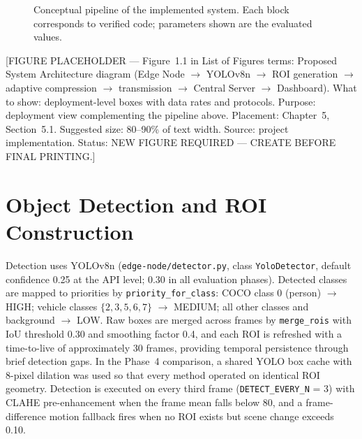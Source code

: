\begin{figure}[H]
\centering
{}
\caption{Conceptual pipeline of the implemented system. Each block corresponds to verified code; parameters shown are the evaluated values.}
\label{fig:pipeline}
\end{figure}

[FIGURE PLACEHOLDER --- Figure~1.1 in List of Figures terms: Proposed System Architecture diagram (Edge Node $\rightarrow$ YOLOv8n $\rightarrow$ ROI generation $\rightarrow$ adaptive compression $\rightarrow$ transmission $\rightarrow$ Central Server $\rightarrow$ Dashboard). What to show: deployment-level boxes with data rates and protocols. Purpose: deployment view complementing the pipeline above. Placement: Chapter~5, Section~5.1. Suggested size: 80--90\% of text width. Source: project implementation. Status: NEW FIGURE REQUIRED --- CREATE BEFORE FINAL PRINTING.]

\section{Object Detection and ROI Construction}

Detection uses YOLOv8n (\texttt{edge-node/detector.py}, class \texttt{YoloDetector}, default confidence 0.25 at the API level; 0.30 in all evaluation phases). Detected classes are mapped to priorities by \texttt{priority\_for\_class}: COCO class 0 (person) $\rightarrow$ HIGH; vehicle classes $\{2,3,5,6,7\}$ $\rightarrow$ MEDIUM; all other classes and background $\rightarrow$ LOW. Raw boxes are merged across frames by \texttt{merge\_rois} with IoU threshold 0.30 and smoothing factor 0.4, and each ROI is refreshed with a time-to-live of approximately 30 frames, providing temporal persistence through brief detection gaps. In the Phase~4 comparison, a shared YOLO box cache with 8-pixel dilation was used so that every method operated on identical ROI geometry. Detection is executed on every third frame (\texttt{DETECT\_EVERY\_N} = 3) with CLAHE pre-enhancement when the frame mean falls below 80, and a frame-difference motion fallback fires when no ROI exists but scene change exceeds 0.10.

